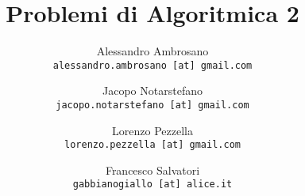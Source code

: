 \documentclass[a4paper, 12pt]{report}
\theoremstyle{plain}
\begin{document}
    \title{Problemi di Algoritmica 2}
    \author{
        Alessandro Ambrosano\\
        \texttt{alessandro.ambrosano [at] gmail.com}
        \and
        Jacopo Notarstefano\\
        \texttt{jacopo.notarstefano [at] gmail.com}
        \and
        Lorenzo Pezzella\\
        \texttt{lorenzo.pezzella [at] gmail.com}
        \and
        Francesco Salvatori\\
        \texttt{gabbianogiallo [at] alice.it}
    }
    
    \maketitle

    
    
    
     
    
    
    
    
    
    
    
    
    
    
    
    
    
    
    
    
    
    
    
\end{document}
